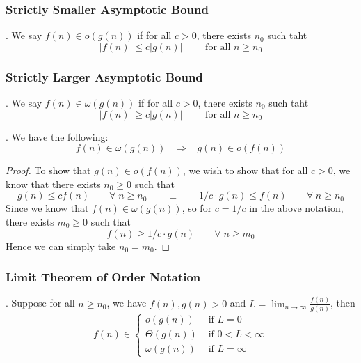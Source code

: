 \documentclass{article}
\begin{document}
\subsubsection{Strictly Smaller Asymptotic Bound}

\begin{deff}.
    We say $f(n) \in o(g(n))$ if for all $c > 0$, there exists $n_0$ such taht 
    \[ |f(n)| \leq c |g(n)| \qquad \text{ for all } n \geq n_0 \]
\end{deff}

\subsubsection{Strictly Larger Asymptotic Bound}

\begin{deff}.
    We say $f(n) \in \omega(g(n))$ if for all $c > 0$, there exists $n_0$ such taht 
    \[ |f(n)| \geq c |g(n)| \qquad \text{ for all } n \geq n_0 \]
\end{deff}

\begin{thmm}[].
    We have the following: 
    \[ f(n) \in \omega(g(n)) \;\;\; \Rightarrow \;\;\; g(n) \in o(f(n)) \]
\end{thmm}

\begin{proof}
    To show that $g(n) \in o(f(n))$, we wish to show that for all $c > 0$, we know that there exists $n_0 \geq 0$ such that 
    \[ g(n) \leq c f(n) \qquad \forall \; n \geq n_0 \qquad \equiv \qquad 1/c \cdot g(n) \leq f(n) \qquad \forall \; n \geq n_0 \] 
    Since we know that $f(n) \in \omega(g(n))$, so for $c = 1/c$ in the above notation, there exists $m_0 \geq 0$ such that 
    \[ f(n) \geq 1/c \cdot g(n) \qquad \forall \; n \geq m_0 \]
    Hence we can simply take $n_0 = m_0$. 
\end{proof}

\begin{center}
\end{center}

\subsubsection{Limit Theorem of Order Notation}

\begin{thmm}.
    Suppose for all $n \geq n_0$, we have $f(n), g(n) >0$ and $\displaystyle L = \lim_{n \to \infty} \frac{f(n)}{g(n)}$, then 
    \[ f(n) \in \begin{cases}
        o(g(n)) & \text{ if } L = 0 \\ 
        \Theta(g(n)) & \text{ if } 0 < L < \infty \\ 
        \omega(g(n)) & \text{ if } L = \infty
    \end{cases} \]
\end{thmm}
\end{document}
